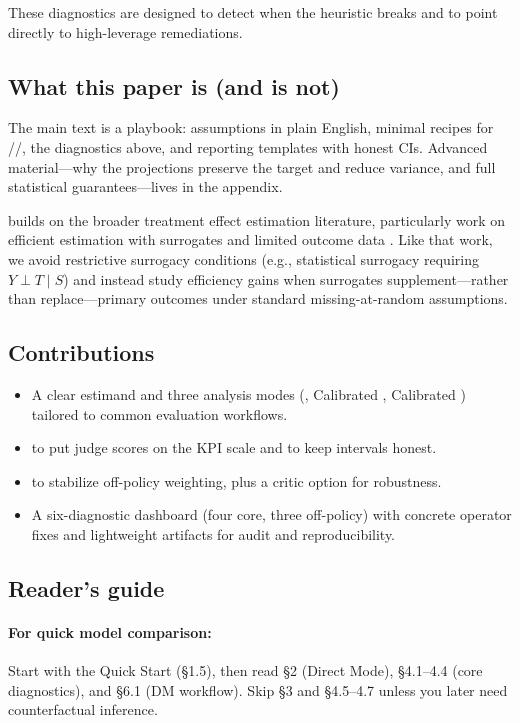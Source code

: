 These diagnostics are designed to detect when the heuristic breaks and to point directly to high-leverage remediations.

\subsection{What this paper is (and is not)}

The main text is a playbook: assumptions in plain English, minimal recipes for \dm/\ips/\dr, the diagnostics above, and reporting templates with honest CIs. Advanced material---why the projections preserve the target and reduce variance, and full statistical guarantees---lives in the appendix.

\cje{} builds on the broader treatment effect estimation literature, particularly work on efficient estimation with surrogates and limited outcome data \cite{kallus2024role}. Like that work, we avoid restrictive surrogacy conditions (e.g., statistical surrogacy requiring $Y \perp T \mid S$) and instead study efficiency gains when surrogates supplement---rather than replace---primary outcomes under standard missing-at-random assumptions.

\subsection{Contributions}

\begin{itemize}
\item A clear estimand and three analysis modes (\dm, Calibrated \ips, Calibrated \dr) tailored to common evaluation workflows.

\item \autocal{} to put judge scores on the KPI scale and \oua{} to keep intervals honest.

\item \simcal{} to stabilize off-policy weighting, plus a critic option for \dr{} robustness.

\item A six-diagnostic dashboard (four core, three off-policy) with concrete operator fixes and lightweight artifacts for audit and reproducibility.
\end{itemize}

\subsection{Reader's guide}

\paragraph{For quick model comparison:} Start with the Quick Start (§1.5), then read §2 (Direct Mode), §4.1--4.4 (core diagnostics), and §6.1 (DM workflow). Skip §3 and §4.5--4.7 unless you later need counterfactual inference.

